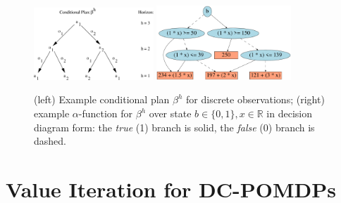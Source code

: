 \documentclass{article} %
\begin{document}
\begin{figure}[t!]
\begin{center}
\includegraphics[width=0.4\textwidth]{pics/cond_plan2.pdf}
\hspace{10mm}
\includegraphics[width=0.45\textwidth]{pics/dag2.pdf}
\end{center}
\vspace{-2mm}
\caption{\footnotesize (left) Example conditional plan $\beta^h$ for
discrete observations; (right) example $\alpha$-function for $\beta^h$
over state $b \in \{0,1\}, x \in \mathbb{R}$ in decision
diagram form: the \emph{true} (1) branch is solid, the \emph{false} (0) branch is
dashed.}
\label{fig:cond_plan}
\end{figure}

\section{Value Iteration for DC-POMDPs}
\end{document}
